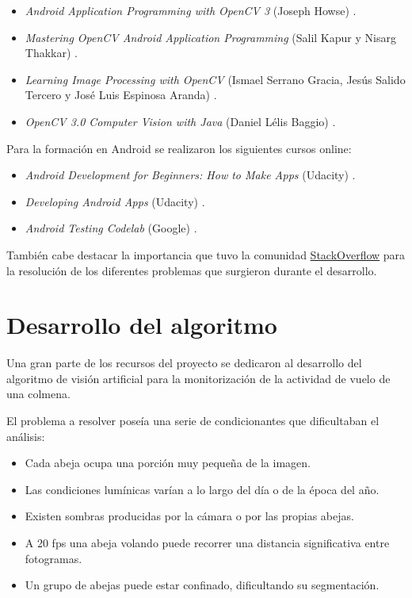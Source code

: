 \begin{itemize}
\tightlist
\item
  \emph{Android Application Programming with OpenCV 3} (Joseph Howse)
  \citep{book:android_opencv}.
\item
  \emph{Mastering OpenCV Android Application Programming} (Salil Kapur y
  Nisarg Thakkar) \citep{book:mastering_opencv}.
\item
  \emph{Learning Image Processing with OpenCV} (Ismael Serrano Gracia,
  Jesús Salido Tercero y José Luis Espinosa Aranda)
  \citep{book:learning_cv}.
\item
  \emph{OpenCV 3.0 Computer Vision with Java} (Daniel Lélis Baggio)
  \citep{book:opencv_java}.
\end{itemize}

Para la formación en Android se realizaron los siguientes cursos online:

\begin{itemize}
\tightlist
\item
  \emph{Android Development for Beginners: How to Make Apps} (Udacity)
  \citep{course:android_beginners}.
\item
  \emph{Developing Android Apps} (Udacity)
  \citep{course:developing_android}.
\item
  \emph{Android Testing Codelab} (Google) \citep{course:testing}.
\end{itemize}

También cabe destacar la importancia que tuvo la comunidad
\href{http://stackoverflow.com/}{StackOverflow} para la resolución de
los diferentes problemas que surgieron durante el desarrollo.

\section{Desarrollo del algoritmo}\label{desarrollo-del-algoritmo}

Una gran parte de los recursos del proyecto se dedicaron al desarrollo
del algoritmo de visión artificial para la monitorización de la
actividad de vuelo de una colmena.

El problema a resolver poseía una serie de condicionantes que
dificultaban el análisis:

\begin{itemize}
\tightlist
\item
  Cada abeja ocupa una porción muy pequeña de la imagen.
\item
  Las condiciones lumínicas varían a lo largo del día o de la época del
  año.
\item
  Existen sombras producidas por la cámara o por las propias abejas.
\item
  A 20 fps una abeja volando puede recorrer una distancia significativa
  entre fotogramas.
\item
  Un grupo de abejas puede estar confinado, dificultando su
  segmentación.
\end{itemize}

